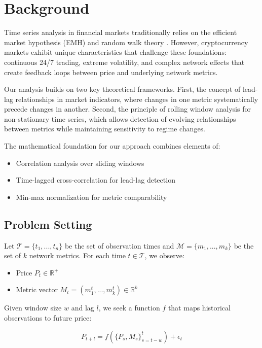 \documentclass{article} %
\begin{document}
\section{Background}
\label{sec:background}

Time series analysis in financial markets traditionally relies on the efficient market hypothesis (EMH) and random walk theory \citep{Ji2019ACS}. However, cryptocurrency markets exhibit unique characteristics that challenge these foundations: continuous 24/7 trading, extreme volatility, and complex network effects that create feedback loops between price and underlying network metrics.

Our analysis builds on two key theoretical frameworks. First, the concept of lead-lag relationships in market indicators, where changes in one metric systematically precede changes in another. Second, the principle of rolling window analysis for non-stationary time series, which allows detection of evolving relationships between metrics while maintaining sensitivity to regime changes.

The mathematical foundation for our approach combines elements of:
\begin{itemize}
    \item Correlation analysis over sliding windows
    \item Time-lagged cross-correlation for lead-lag detection
    \item Min-max normalization for metric comparability
\end{itemize}

\subsection{Problem Setting}
\label{subsec:problem}

Let $\mathcal{T} = \{t_1, ..., t_n\}$ be the set of observation times and $\mathcal{M} = \{m_1, ..., m_k\}$ be the set of $k$ network metrics. For each time $t \in \mathcal{T}$, we observe:
\begin{itemize}
    \item Price $P_t \in \mathbb{R}^+$
    \item Metric vector $M_t = (m_1^t, ..., m_k^t) \in \mathbb{R}^k$
\end{itemize}

Given window size $w$ and lag $l$, we seek a function $f$ that maps historical observations to future price:

\begin{equation}
P_{t+l} = f(\{P_s, M_s\}_{s=t-w}^t) + \epsilon_t
\end{equation}
\end{document}
